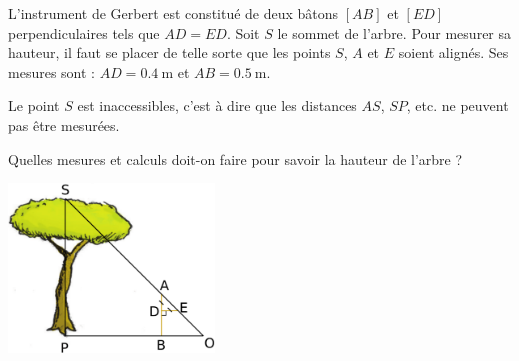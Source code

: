 
\begin{exercice}\label{exo2smath-0061}

    \begin{multicols}{2}

        L'instrument de Gerbert est constitué de deux bâtons $[AB]$ et $[ED]$ perpendiculaires tels que $AD = ED$.  Soit $S$ le sommet de l'arbre. Pour mesurer sa hauteur, il faut se placer de telle sorte que les points $S$, $A$ et $E$ soient alignés. Ses mesures sont : \( AD=\SI{0.4}{\meter}\) et \( AB=\SI{0.5}{\meter}\).

        Le point \( S\) est inaccessibles, c'est à dire que les distances \( AS\), \( SP\), etc. ne peuvent pas être mesurées.

        Quelles mesures et calculs doit-on faire pour savoir la hauteur de l'arbre ?

\columnbreak

\includegraphics[height=4.5cm]{arbre.pdf}


    \end{multicols}

\end{exercice}
